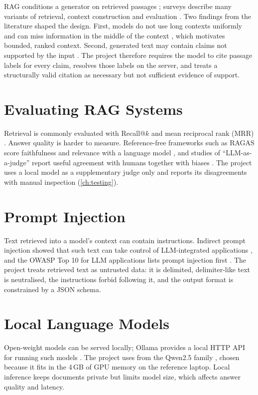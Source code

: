 RAG conditions a generator on retrieved passages \cite{lewis2020rag}; surveys describe many variants of retrieval,
context construction and evaluation \cite{gao2023ragsurvey}. Two findings from the literature shaped the design.
First, models do not use long contexts uniformly and can miss information in the middle of the context
\cite{liu2024lostmiddle}, which motivates bounded, ranked context. Second, generated text may contain claims not
supported by the input \cite{ji2023hallucination}. The project therefore requires the model to cite passage labels
for every claim, resolves those labels on the server, and treats a structurally valid citation as necessary but
not sufficient evidence of support.

\section{Evaluating RAG Systems}

Retrieval is commonly evaluated with Recall@$k$ and mean reciprocal rank (MRR) \cite{manning2008ir,voorhees1999trec8qa}.
Answer quality is harder to measure. Reference-free frameworks such as RAGAS score faithfulness and relevance with
a language model \cite{es2023ragas}, and studies of ``LLM-as-a-judge'' report useful agreement with humans together
with biases \cite{zheng2023judge}. The project uses a local model as a supplementary judge only and reports its
disagreements with manual inspection (\autoref{ch:testing}).

\section{Prompt Injection}

Text retrieved into a model's context can contain instructions. Indirect prompt injection showed that such text
can take control of LLM-integrated applications \cite{greshake2023injection}, and the OWASP Top 10 for LLM
applications lists prompt injection first \cite{owaspllm}. The project treats retrieved text as untrusted data: it is
delimited, delimiter-like text is neutralised, the instructions forbid following it, and the output format is
constrained by a JSON schema.

\section{Local Language Models}

Open-weight models can be served locally; Ollama provides a local HTTP API for running such models
\cite{ollama}. The project uses  from the Qwen2.5 family \cite{qwen2024qwen25}, chosen because it
fits in the 4\,GB of GPU memory on the reference laptop. Local inference keeps documents private but limits model
size, which affects answer quality and latency.

